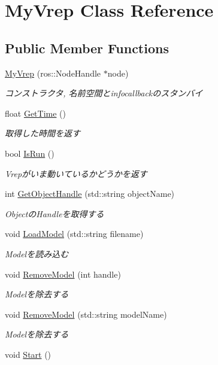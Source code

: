 \hypertarget{classMyVrep}{\section{My\-Vrep Class Reference}
\label{classMyVrep}
}
\subsection*{Public Member Functions}
\begin{DoxyCompactItemize}
\item 
\hyperlink{classMyVrep_ad04ad612d83dea285cfcc994d5904849}{My\-Vrep} (ros\-::\-Node\-Handle $\ast$node)
\begin{DoxyCompactList}\small\item\em コンストラクタ, 名前空間とinfocallbackのスタンバイ \end{DoxyCompactList}\item 
float \hyperlink{classMyVrep_a301856627257f56ea4dc62f40cd53505}{Get\-Time} ()
\begin{DoxyCompactList}\small\item\em 取得した時間を返す \end{DoxyCompactList}\item 
bool \hyperlink{classMyVrep_a24aa7c4b24ff512a366b0a0cdacdc867}{Is\-Run} ()
\begin{DoxyCompactList}\small\item\em Vrepがいま動いているかどうかを返す \end{DoxyCompactList}\item 
int \hyperlink{classMyVrep_a0c2040190b0326acba9ef14ce74a5d6f}{Get\-Object\-Handle} (std\-::string object\-Name)
\begin{DoxyCompactList}\small\item\em Objectの\-Handleを取得する \end{DoxyCompactList}\item 
void \hyperlink{classMyVrep_a0f2e523e6a68bde936c224b83d60af66}{Load\-Model} (std\-::string filename)
\begin{DoxyCompactList}\small\item\em Modelを読み込む \end{DoxyCompactList}\item 
void \hyperlink{classMyVrep_add24917b44a09b75496d76d8cda107af}{Remove\-Model} (int handle)
\begin{DoxyCompactList}\small\item\em Modelを除去する \end{DoxyCompactList}\item 
void \hyperlink{classMyVrep_ae9f091cd4ea81eb42d564ccb3de6d034}{Remove\-Model} (std\-::string model\-Name)
\begin{DoxyCompactList}\small\item\em Modelを除去する \end{DoxyCompactList}\item 
\hypertarget{classMyVrep_a8e56cc5f090220b30c27ead7d0484e49}{void \hyperlink{classMyVrep_a8e56cc5f090220b30c27ead7d0484e49}{Start} ()}\label{classMyVrep_a8e56cc5f090220b30c27ead7d0484e49}


\end{DoxyCompactItemize}
